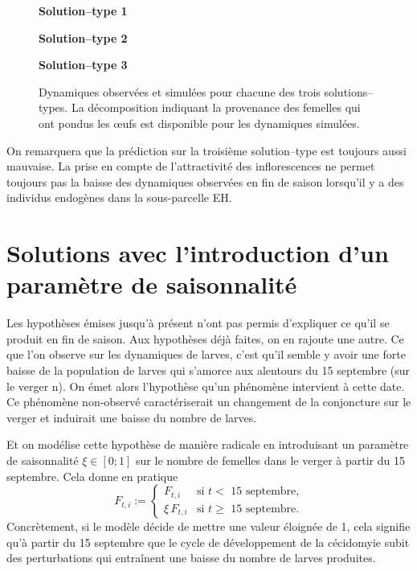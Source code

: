 \begin{figure}[ht]
 \centering
 
  \centering
 \textbf{Solution--type 1}
 
 
 \textbf{Solution--type 2}
 
 
 \textbf{Solution--type 3}
 
 
 
 \caption{Dynamiques observées et simulées pour chacune des trois solutions--types. La décomposition indiquant la provenance des femelles qui ont pondus les œufs est disponible pour les dynamiques simulées.}
 \label{fig:C}
\end{figure}


On remarquera que la prédiction sur la troisième solution--type est toujours aussi mauvaise.
La prise en compte de l'attractivité des inflorescences ne permet toujours pas la baisse des dynamiques observées en fin de saison lorsqu'il y a des individus endogènes dans la sous-parcelle EH.

\clearpage
\section{Solutions avec l'introduction d'un paramètre de saisonnalité}

Les hypothèses émises jusqu'à présent n'ont pas permis d'expliquer ce qu'il se produit en fin de saison.
Aux hypothèses déjà faites, on en rajoute une autre.
Ce que l'on observe sur les dynamiques de larves, c'est qu'il semble y avoir une forte baisse de la population de larves qui s'amorce aux alentours du 15 septembre (sur le verger n).
On émet alors l'hypothèse qu'un phénomène intervient à cette date.
Ce phénomène non-observé caractériserait un changement de la conjoncture sur le verger et induirait une baisse du nombre de larves.

Et on modélise cette hypothèse de manière radicale en introduisant un paramètre de saisonnalité $\xi \in [0;1]$ sur le nombre de femelles dans le verger à partir du 15 septembre.
Cela donne en pratique
\[
F_{t,i} := \begin{cases}
            F_{t, i} & \text{si $t<$ 15 septembre,}\\
            \xi \, F_{t, i} & \text{si $t\geq$ 15 septembre.}
           \end{cases}
\]
Concrètement, si le modèle décide de mettre une valeur éloignée de 1, cela signifie qu'à partir du 15 septembre que le cycle de développement de la cécidomyie subit des perturbations qui entraînent une baisse du nombre de larves produites.

